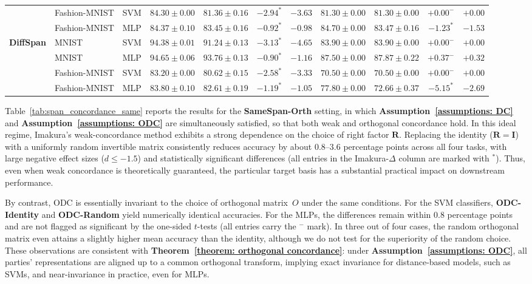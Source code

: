 \documentclass[final,3p,times]{elsarticle}
\theoremstyle{plain}
\newcommand{\matr}[1]{\bm{#1}}        %
\begin{document}
\begin{table}[htbp]
{\begin{tabular}{lllcccccccc}
      & Fashion-MNIST & SVM  & $84.30\pm0.00$ & $81.36\pm0.16$ & $-2.94^{*}$ & $-3.63$ & $81.30\pm0.00$ & $81.30\pm0.00$ & $+0.00^{-}$ & $+0.00$ \\
      & Fashion-MNIST & MLP  & $84.37\pm0.10$ & $83.45\pm0.16$ & $-0.92^{*}$ & $-0.98$ & $84.70\pm0.00$ & $83.47\pm0.16$ & $-1.23^{*}$ & $-1.53$ \\
    \midrule
    \multirow{4}{*}{\textbf{DiffSpan}}
      & MNIST         & SVM  & $94.38\pm0.01$ & $91.24\pm0.13$ & $-3.13^{*}$ & $-4.65$ & $83.90\pm0.00$ & $83.90\pm0.00$ & $+0.00^{-}$ & $+0.00$ \\
      & MNIST         & MLP  & $94.65\pm0.06$ & $93.76\pm0.13$ & $-0.90^{*}$ & $-1.16$ & $87.50\pm0.00$ & $87.87\pm0.22$ & $+0.37^{-}$ & $+0.32$ \\
      & Fashion-MNIST & SVM  & $83.20\pm0.00$ & $80.62\pm0.15$ & $-2.58^{*}$ & $-3.33$ & $70.50\pm0.00$ & $70.50\pm0.00$ & $+0.00^{-}$ & $+0.00$ \\
      & Fashion-MNIST & MLP  & $83.80\pm0.10$ & $82.61\pm0.19$ & $-1.19^{*}$ & $-1.05$ & $77.80\pm0.00$ & $72.66\pm0.37$ & $-5.15^{*}$ & $-2.69$ \\
    \bottomrule
  \end{tabular}
  }
  \label{tab:span_concordance_comparison}
\end{table}

Table~\ref{tab:span_concordance_same} reports the results for the \textbf{SameSpan-Orth} setting, in which \textbf{Assumption~\ref{assumptions: DC}} and \textbf{Assumption~\ref{assumptions: ODC}} are simultaneously satisfied, so that both weak and orthogonal concordance hold. In this ideal regime, Imakura's weak-concordance method exhibits a strong dependence on the choice of right factor $\matr{R}$. Replacing the identity ($\matr{R} = \matr{I}$) with a uniformly random invertible matrix consistently reduces accuracy by about $0.8$--$3.6$ percentage points across all four tasks, with large negative effect sizes ($d \le -1.5$) and statistically significant differences (all entries in the Imakura-$\Delta$ column are marked with ${}^{*}$). Thus, even when weak concordance is theoretically guaranteed, the particular target basis has a substantial practical impact on downstream performance.

By contrast, ODC is essentially invariant to the choice of orthogonal matrix~$O$ under the same conditions. For the SVM classifiers, \textbf{ODC-Identity} and \textbf{ODC-Random} yield numerically identical accuracies. For the MLPs, the differences remain within $0.8$ percentage points and are not flagged as significant by the one-sided $t$-tests (all entries carry the $^{-}$ mark). In three out of four cases, the random orthogonal matrix even attains a slightly higher mean accuracy than the identity, although we do not test for the superiority of the random choice. These observations are consistent with \textbf{Theorem~\ref{theorem: orthogonal concordance}}: under \textbf{Assumption~\ref{assumptions: ODC}}, all parties' representations are aligned up to a common orthogonal transform, implying exact invariance for distance-based models, such as SVMs, and near-invariance in practice, even for MLPs.
\end{document}

